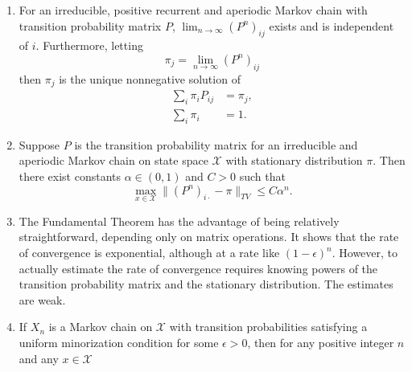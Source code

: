\documentclass[12pt]{article}
\begin{document}
\begin{enumerate}
    \item
        \begin{theorem}
            For an irreducible, positive recurrent and aperiodic Markov
            chain with transition probability matrix \( P \), \( \lim_{n
            \to \infty} (P^n)_{ij} \) exists and is independent of \( i \).
            Furthermore, letting
            \[
                \pi_j = \lim_{n \to \infty} (P^n)_{ij}
            \] then \( \pi_j \) is the unique nonnegative solution of
            \begin{align}
                \sum\limits_{i} \pi_{i} P_{ij} &= \pi_{j},%
                \label{eq:convergencestationary:FTMC1}\\
                \sum\limits_{i} \pi_{i} &= 1.%
                \label{eq:convergencestationary:FTMC2}
            \end{align}
        \end{theorem}
    \item
        \begin{theorem}
            Suppose \( P \) is the transition probability matrix for an
            irreducible and aperiodic Markov chain on state space \(
            \mathcal{X} \) with stationary distribution \( \pi \).  Then
            there exist constants \( \alpha \in (0,1) \) and \( C > 0 \)
            such that
            \[
                \max_{x \in \mathcal{X}} \| (P^n)_{i \cdot} - \pi \|_{TV}
                \le C \alpha^n.
            \]
        \end{theorem}
    \item
        The Fundamental Theorem has the advantage of being relatively
        straightforward, depending only on matrix operations.  It shows
        that the rate of convergence is exponential, although at a rate
        like \( (1-\epsilon)^n \).  However, to actually estimate the
        rate of convergence requires knowing powers of the transition
        probability matrix and the stationary distribution.  The
        estimates are weak.
    \item
        \begin{theorem}
            If \( X_n \) is a Markov chain on \( \mathcal{X} \) with
            transition probabilities satisfying a uniform minorization
            condition for some \( \epsilon > 0 \), then for any positive
            integer \( n \) and any \( x \in \mathcal{X} \)

\end{theorem}
\end{enumerate}
\end{document}
